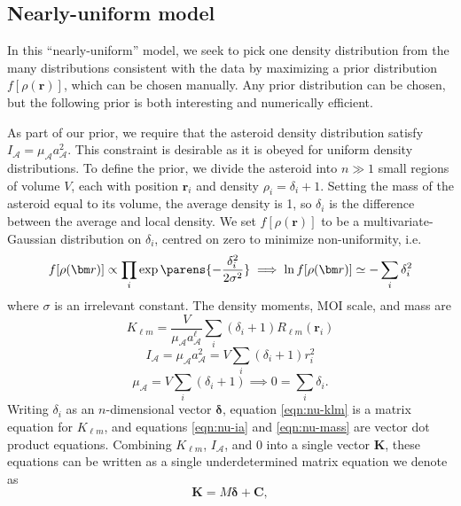 \subsection{Nearly-uniform model}
In this ``nearly-uniform'' model, we seek to pick one density distribution from the many distributions consistent with the data by maximizing a prior distribution $f[\rho(\bm r)]$, which can be chosen manually. Any prior distribution can be chosen, but the following prior is both interesting and numerically efficient.

As part of our prior, we require that the asteroid density distribution satisfy $I_\mathcal{A} = \mu_\mathcal{A} a_\mathcal{A}^2$. This constraint is desirable as it is obeyed for uniform density distributions. To define the prior, we divide the asteroid into $n \gg 1$ small regions of volume $V$, each with position $\bm r_i$ and density $\rho_i = \delta_i + 1$. Setting the mass of the asteroid equal to its volume, the average density is 1, so $\delta_i$ is the difference between the average and local density. We set $f[\rho(\bm r)]$ to be a multivariate-Gaussian distribution on $\delta_i$, centred on zero to minimize non-uniformity, i.e.
\begin{equation}
  f[\rho(\bm r)] \propto \prod_i \exp\parens{-\frac{\delta_i^2}{2\sigma^2}} \implies \ln f[\rho(\bm r)] \simeq -\sum_i \delta_i^2
  \label{eqn:nu-f}
\end{equation}
where $\sigma$ is an irrelevant constant. The density moments, MOI scale, and mass are 
\begin{equation}
  K_{\ell m} = \frac{V}{\mu_\mathcal{A}a_\mathcal{A}^{\ell}} \sum_i (\delta_i + 1) R_{\ell m}(\bm r_i)
  \label{eqn:nu-klm}
\end{equation}
\begin{equation}
  I_\mathcal{A} = \mu_\mathcal{A} a_\mathcal{A}^2 = V \sum_i (\delta_i + 1) r_i^2
  \label{eqn:nu-ia}
\end{equation}
\begin{equation}
  \mu_\mathcal{A} = V\sum_i (\delta_i + 1) \implies 0 = \sum_i \delta_i.
  \label{eqn:nu-mass}
\end{equation}
Writing $\delta_i$ as an $n$-dimensional vector $\bm \delta$, equation \ref{eqn:nu-klm} is a matrix equation for $K_{\ell m}$, and equations \ref{eqn:nu-ia} and \ref{eqn:nu-mass} are vector dot product equations. Combining $K_{\ell m}$, $I_\mathcal{A}$, and $0$ into a single vector $\bm K$, these equations can be written as a single underdetermined matrix equation we denote as 
\begin{equation}
  \bm K = M \bm \delta + \bm C,
  \label{eqn:nu-matrix}
\end{equation}
